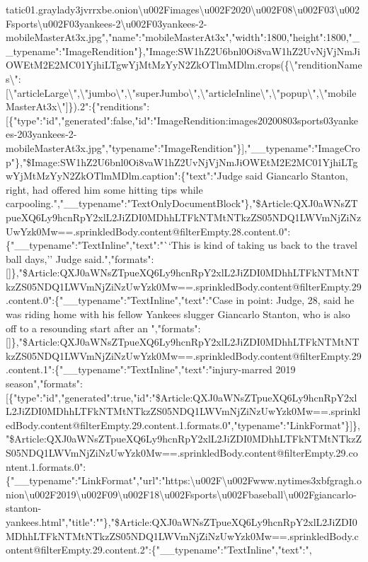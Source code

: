 tatic01.graylady3jvrrxbe.onion\textbackslash{}u002Fimages\textbackslash{}u002F2020\textbackslash{}u002F08\textbackslash{}u002F03\textbackslash{}u002Fsports\textbackslash{}u002F03yankees-2\textbackslash{}u002F03yankees-2-mobileMasterAt3x.jpg","name":"mobileMasterAt3x","width":1800,"height":1800,"\_\_typename":"ImageRendition"\},"Image:SW1hZ2U6bnl0Oi8vaW1hZ2UvNjVjNmJiOWEtM2E2MC01YjhiLTgwYjMtMzYyN2ZkOTlmMDlm.crops(\{\textbackslash{}"renditionNames\textbackslash{}":{[}\textbackslash{}"articleLarge\textbackslash{}",\textbackslash{}"jumbo\textbackslash{}",\textbackslash{}"superJumbo\textbackslash{}",\textbackslash{}"articleInline\textbackslash{}",\textbackslash{}"popup\textbackslash{}",\textbackslash{}"mobileMasterAt3x\textbackslash{}"{]}\}).2":\{"renditions":{[}\{"type":"id","generated":false,"id":"ImageRendition:images20200803sports03yankees-203yankees-2-mobileMasterAt3x.jpg","typename":"ImageRendition"\}{]},"\_\_typename":"ImageCrop"\},"\$Image:SW1hZ2U6bnl0Oi8vaW1hZ2UvNjVjNmJiOWEtM2E2MC01YjhiLTgwYjMtMzYyN2ZkOTlmMDlm.caption":\{"text":"Judge
said Giancarlo Stanton, right, had offered him some hitting tips while
carpooling.","\_\_typename":"TextOnlyDocumentBlock"\},"\$Article:QXJ0aWNsZTpueXQ6Ly9hcnRpY2xlL2JiZDI0MDhhLTFkNTMtNTkzZS05NDQ1LWVmNjZiNzUwYzk0Mw==.sprinkledBody.content@filterEmpty.28.content.0":\{"\_\_typename":"TextInline","text":"``This
is kind of taking us back to the travel ball days,'' Judge
said.","formats":{[}{]}\},"\$Article:QXJ0aWNsZTpueXQ6Ly9hcnRpY2xlL2JiZDI0MDhhLTFkNTMtNTkzZS05NDQ1LWVmNjZiNzUwYzk0Mw==.sprinkledBody.content@filterEmpty.29.content.0":\{"\_\_typename":"TextInline","text":"Case
in point: Judge, 28, said he was riding home with his fellow Yankees
slugger Giancarlo Stanton, who is also off to a resounding start after
an
","formats":{[}{]}\},"\$Article:QXJ0aWNsZTpueXQ6Ly9hcnRpY2xlL2JiZDI0MDhhLTFkNTMtNTkzZS05NDQ1LWVmNjZiNzUwYzk0Mw==.sprinkledBody.content@filterEmpty.29.content.1":\{"\_\_typename":"TextInline","text":"injury-marred
2019
season","formats":{[}\{"type":"id","generated":true,"id":"\$Article:QXJ0aWNsZTpueXQ6Ly9hcnRpY2xlL2JiZDI0MDhhLTFkNTMtNTkzZS05NDQ1LWVmNjZiNzUwYzk0Mw==.sprinkledBody.content@filterEmpty.29.content.1.formats.0","typename":"LinkFormat"\}{]}\},"\$Article:QXJ0aWNsZTpueXQ6Ly9hcnRpY2xlL2JiZDI0MDhhLTFkNTMtNTkzZS05NDQ1LWVmNjZiNzUwYzk0Mw==.sprinkledBody.content@filterEmpty.29.content.1.formats.0":\{"\_\_typename":"LinkFormat","url":"https:\textbackslash{}u002F\textbackslash{}u002Fwww.nytimes3xbfgragh.onion\textbackslash{}u002F2019\textbackslash{}u002F09\textbackslash{}u002F18\textbackslash{}u002Fsports\textbackslash{}u002Fbaseball\textbackslash{}u002Fgiancarlo-stanton-yankees.html","title":""\},"\$Article:QXJ0aWNsZTpueXQ6Ly9hcnRpY2xlL2JiZDI0MDhhLTFkNTMtNTkzZS05NDQ1LWVmNjZiNzUwYzk0Mw==.sprinkledBody.content@filterEmpty.29.content.2":\{"\_\_typename":"TextInline","text":",
